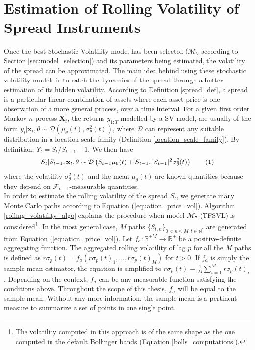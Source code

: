 \documentclass[11pt,a4,twosided,singlespacing,titlepagenumber=on]{scrreprt}
\numberwithin{equation}{chapter} %
\theoremstyle{remark}
\newcommand{\matr}[1]{\mathbf{#1}}
\newcommand\numberthis{\addtocounter{equation}{1}\tag{\theequation}}
\begin{document}
\section{Estimation of Rolling Volatility of Spread Instruments}
\label{sec:estimation_bollinger_bands_sv}
Once the best Stochastic Volatility model has been selected ($\mathcal{M}_7$ according to Section \ref{sec:model_selection}) and its parameters being estimated, the volatility of the spread can be approximated. The main idea behind using these stochastic volatility models is to catch the dynamics of the spread through a better estimation of its hidden volatility. According to Definition \ref{spread_def}, a spread is a particular linear combination of assets where each asset price is one observation of a more general process, over a time interval. For a given first order Markov $n$-process $\matr{X}_t$, the returns $y_{1:T}$ modelled by a SV model, are usually of the form $y_t | \matr{x}_t, \theta \sim \mathcal{D} \left( \mu_\theta(t), \sigma_\theta^2(t) \right)$, where $\mathcal{D}$ can represent any suitable distribution in a location-scale family (Definition \ref{location_scale_family}). By definition, $Y_t = S_t / S_{t-1} - 1$. We then have
\begin{equation}
S_t | S_{t-1}, \matr{x}_t, \theta \sim \mathcal{D} \left(S_{t-1} \mu_\theta(t)+S_{t-1}, |S_{t-1}|^2 \sigma_\theta^2(t) \right) \numberthis \label{equation_price_vol}
\end{equation}
where the volatility $\sigma_\theta^2(t)$ and the mean $\mu_\theta(t)$ are known quantities because they depend on $\mathcal{F}_{t-1}$-measurable quantities. \\

In order to estimate the rolling volatility of the spread $S_t$, we generate many Monte Carlo paths according to Equation (\ref{equation_price_vol}). Algorithm \ref{rolling_volatility_algo} explains the procedure when model $\mathcal{M}_7$ (TFSVL) is considered\footnote{The volatility computed in this approach is of the same shape as the one computed in the default Bollinger bands (Equation \ref{bolls_computations}).}. In the most general case, $M$ paths $\{S_{t,n}\}_{0 < n \leq M, t \in \mathbb{N}^*}$ are generated from Equation (\ref{equation_price_vol}). Let $f_a : \mathbb{R}^{+M} \rightarrow \mathbb{R}^+$ be a positive-definite aggregating function. The aggregated rolling volatility of lag $p$ for all the $M$ paths is defined as $r\sigma_p(t) = f_a(r\sigma_p(t)_1,...,r\sigma_p(t)_M)$ for $t >0$. If $f_a$ is simply the sample mean estimator, the equation is simplified to $r\sigma_p(t) = \frac{1}{M}\sum_{i=1}^M r\sigma_p(t)_i$. Depending on the context, $f_a$ can be any measurable function satisfying the conditions above. Throughout the scope of this thesis, $f_a$ will be equal to the sample mean. Without any more information, the sample mean is a pertinent measure to summarize a set of points in one single point.
\end{document}
